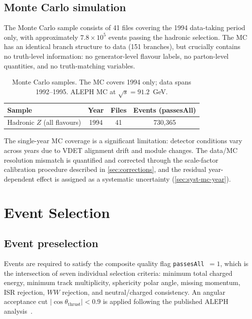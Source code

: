 \documentclass[11pt,a4paper]{article}
\begin{document}
\subsection{Monte Carlo simulation}

The Monte Carlo sample consists of 41 files covering the 1994 data-taking
period only, with approximately $7.8 \times 10^5$ events passing the
hadronic selection.  The MC has an identical branch structure to data
(151 branches), but crucially contains no truth-level information: no
generator-level flavour labels, no parton-level quantities, and no
truth-matching variables.

\begin{table}[htbp]
\centering
\caption{Monte Carlo samples.  The MC covers 1994 only; data spans
  1992--1995.  ALEPH MC at $\sqrt{s} = 91.2$~GeV.}
\label{tbl:mc}
\begin{tabular}{lccc}
\toprule
Sample & Year & Files & Events (passesAll) \\
\midrule
Hadronic $Z$ (all flavours) & 1994 & 41 & 730,365 \\
\bottomrule
\end{tabular}
\end{table}

The single-year MC coverage is a significant limitation: detector
conditions vary across years due to VDET alignment drift and module
changes.  The data/MC resolution mismatch is quantified and corrected
through the scale-factor calibration procedure described in
\cref{sec:corrections}, and the residual year-dependent effect is
assigned as a systematic uncertainty (\cref{sec:syst-mc-year}).

\section{Event Selection}
\label{sec:selection}

\subsection{Event preselection}

Events are required to satisfy the composite quality flag
\texttt{passesAll}~$= 1$, which is the intersection of seven individual
selection criteria: minimum total charged energy, minimum track
multiplicity, sphericity polar angle, missing momentum, ISR rejection,
$WW$ rejection, and neutral/charged consistency.  An angular acceptance
cut $|\cos\theta_\mathrm{thrust}| < 0.9$ is applied following the
published ALEPH analysis~\cite{ALEPH:AFBb}.
\end{document}
